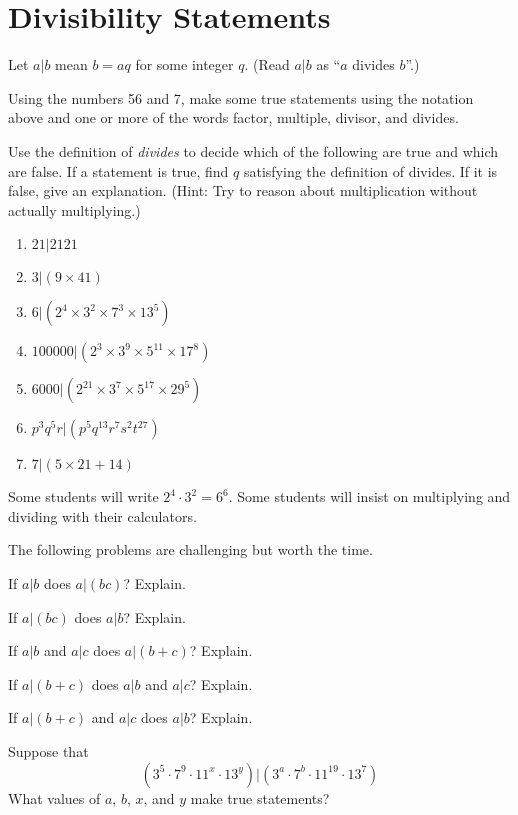 \newpage
\section{Divisibility Statements}\label{A:divisibilityStatements}

Let $a|b$ mean $b=aq$ for some integer $q$.  (Read $a|b$ as ``$a$ divides $b$''.)  

\begin{prob}
Using the numbers 56 and 7, make some true statements using the notation above and one or more of the words factor, multiple, divisor, and divides.  
\end{prob}

\begin{prob}
Use the definition of \emph{divides} to decide which of the following are true and which are false.  If a statement is true, find $q$ satisfying the definition of divides.  If it is false, give an explanation.  (Hint:  Try to reason about multiplication without actually multiplying.)
\begin{enumerate}
\item $21|2121$
\item $3|(9\times 41)$
\item $6|(2^4\times 3^2\times 7^3\times 13^5)$
\item $100000|(2^3\times 3^9\times 5^{11}\times 17^8)$
\item $6000|(2^{21}\times 3^7 \times 5^{17}\times 29^5)$
\item $p^3q^5r|(p^5q^{13}r^7s^2t^{27})$
\item $7|(5\times 21 + 14)$
\end{enumerate}
\end{prob}

\begin{teachingnote}
Some students will write $2^4\cdot 3^2=6^6$.  Some students will insist on multiplying and dividing with their calculators. 

The following problems are challenging but worth the time.
\end{teachingnote}

\begin{prob}
If $a|b$ does $a|(bc)$?  Explain. 
\end{prob}

\begin{prob}
If $a|(bc)$ does $a|b$?  Explain. 
\end{prob}

\begin{prob}
If $a|b$ and $a|c$ does $a|(b+c)$?  Explain.  
\end{prob}

\begin{prob}
If $a|(b+c)$ does $a|b$ and $a|c$?  Explain.  
\end{prob}

\begin{prob}
If $a|(b+c)$ and $a|c$ does $a|b$?  Explain.  
\end{prob}

\begin{prob}
Suppose that $$(3^5\cdot 7^9\cdot 11^x\cdot 13^y)|(3^a\cdot 7^b\cdot 11^{19}\cdot 13^7)$$
What values of $a$, $b$, $x$, and $y$ make true statements? 
\end{prob}
